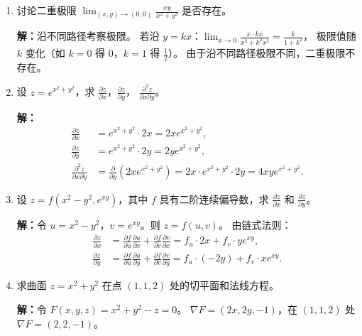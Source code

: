 \documentclass[12pt,a4paper]{ctexart}
\begin{document}
\begin{enumerate}[leftmargin=*,label=\arabic*.,start=35]
  \item 讨论二重极限 $\displaystyle\lim_{(x,y)\to(0,0)}\frac{xy}{x^2+y^2}$ 是否存在。

    \textbf{解：}沿不同路径考察极限。
    若沿 $y=kx$：$\lim_{x\to 0}\frac{x\cdot kx}{x^2+k^2x^2} = \frac{k}{1+k^2}$，
    极限值随 $k$ 变化（如 $k=0$ 得 $0$，$k=1$ 得 $\frac{1}{2}$）。
    由于沿不同路径极限不同，二重极限不存在。

  \item 设 $z = e^{x^2+y^2}$，求 $\frac{\partial z}{\partial x}$，$\frac{\partial z}{\partial y}$，
    $\frac{\partial^2 z}{\partial x \partial y}$。

    \textbf{解：}
    \begin{align*}
      \frac{\partial z}{\partial x} &= e^{x^2+y^2} \cdot 2x = 2x e^{x^2+y^2}, \\
      \frac{\partial z}{\partial y} &= e^{x^2+y^2} \cdot 2y = 2y e^{x^2+y^2}, \\
      \frac{\partial^2 z}{\partial x \partial y}
      &= \frac{\partial}{\partial y}\!\left(2x e^{x^2+y^2}\right)
       = 2x \cdot e^{x^2+y^2} \cdot 2y
       = 4xy e^{x^2+y^2}.
    \end{align*}

  \item 设 $z = f(x^2-y^2, e^{xy})$，其中 $f$ 具有二阶连续偏导数，求
    $\frac{\partial z}{\partial x}$ 和 $\frac{\partial z}{\partial y}$。

    \textbf{解：}令 $u = x^2-y^2$，$v = e^{xy}$。则 $z = f(u,v)$。
    由链式法则：
    \begin{align*}
      \frac{\partial z}{\partial x}
      &= \frac{\partial f}{\partial u}\frac{\partial u}{\partial x}
       + \frac{\partial f}{\partial v}\frac{\partial v}{\partial x}
       = f_u \cdot 2x + f_v \cdot y e^{xy}, \\[4pt]
      \frac{\partial z}{\partial y}
      &= \frac{\partial f}{\partial u}\frac{\partial u}{\partial y}
       + \frac{\partial f}{\partial v}\frac{\partial v}{\partial y}
       = f_u \cdot (-2y) + f_v \cdot x e^{xy}.
    \end{align*}

  \item 求曲面 $z = x^2 + y^2$ 在点 $(1,1,2)$ 处的切平面和法线方程。

    \textbf{解：}令 $F(x,y,z) = x^2+y^2-z = 0$。
    $\nabla F = (2x, 2y, -1)$，在 $(1,1,2)$ 处 $\nabla F = (2, 2, -1)$。


\end{enumerate}
\end{document}
